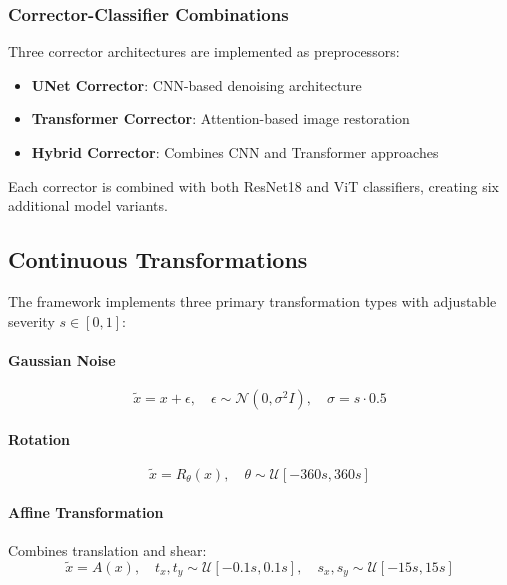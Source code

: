 \documentclass[11pt,a4paper]{article}
\begin{document}
\subsubsection{Corrector-Classifier Combinations}

Three corrector architectures are implemented as preprocessors:
\begin{itemize}
    \item \textbf{UNet Corrector}: CNN-based denoising architecture
    \item \textbf{Transformer Corrector}: Attention-based image restoration
    \item \textbf{Hybrid Corrector}: Combines CNN and Transformer approaches
\end{itemize}

Each corrector is combined with both ResNet18 and ViT classifiers, creating six additional model variants.

\subsection{Continuous Transformations}

The framework implements three primary transformation types with adjustable severity $s \in [0, 1]$:

\paragraph{Gaussian Noise}
\begin{equation}
\tilde{x} = x + \epsilon, \quad \epsilon \sim \mathcal{N}(0, \sigma^2I), \quad \sigma = s \cdot 0.5
\end{equation}

\paragraph{Rotation}
\begin{equation}
\tilde{x} = R_\theta(x), \quad \theta \sim \mathcal{U}[-360s, 360s]
\end{equation}

\paragraph{Affine Transformation}
Combines translation and shear:
\begin{equation}
\tilde{x} = A(x), \quad t_x, t_y \sim \mathcal{U}[-0.1s, 0.1s], \quad s_x, s_y \sim \mathcal{U}[-15s, 15s]
\end{equation}
\end{document}
